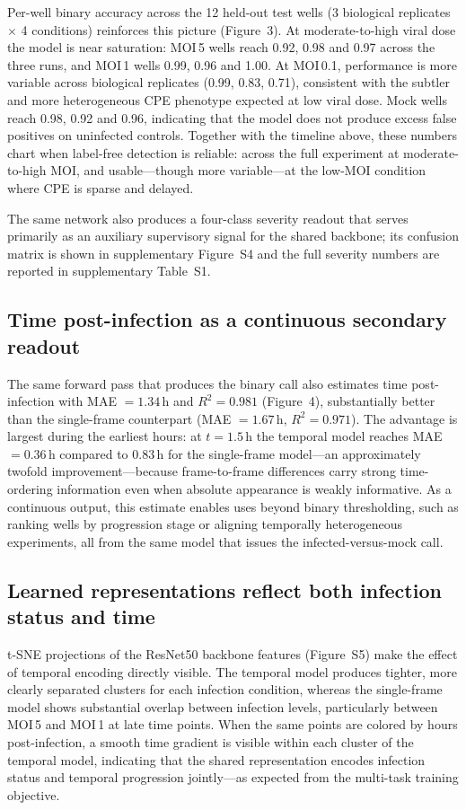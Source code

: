 \documentclass[12pt,letterpaper]{article}
\begin{document}
Per-well binary accuracy across the 12 held-out test wells (3 biological replicates $\times$ 4 conditions) reinforces this picture (Figure~3). At moderate-to-high viral dose the model is near saturation: MOI\,5 wells reach 0.92, 0.98 and 0.97 across the three runs, and MOI\,1 wells 0.99, 0.96 and 1.00. At MOI\,0.1, performance is more variable across biological replicates (0.99, 0.83, 0.71), consistent with the subtler and more heterogeneous CPE phenotype expected at low viral dose. Mock wells reach 0.98, 0.92 and 0.96, indicating that the model does not produce excess false positives on uninfected controls. Together with the timeline above, these numbers chart when label-free detection is reliable: across the full experiment at moderate-to-high MOI, and usable---though more variable---at the low-MOI condition where CPE is sparse and delayed.

The same network also produces a four-class severity readout that serves primarily as an auxiliary supervisory signal for the shared backbone; its confusion matrix is shown in supplementary Figure~S4 and the full severity numbers are reported in supplementary Table~S1.

\subsection*{Time post-infection as a continuous secondary readout}

The same forward pass that produces the binary call also estimates time post-infection with MAE $= 1.34$\,h and $R^2 = 0.981$ (Figure~4), substantially better than the single-frame counterpart (MAE $= 1.67$\,h, $R^2 = 0.971$). The advantage is largest during the earliest hours: at $t = 1.5$\,h the temporal model reaches MAE $= 0.36$\,h compared to 0.83\,h for the single-frame model---an approximately twofold improvement---because frame-to-frame differences carry strong time-ordering information even when absolute appearance is weakly informative. As a continuous output, this estimate enables uses beyond binary thresholding, such as ranking wells by progression stage or aligning temporally heterogeneous experiments, all from the same model that issues the infected-versus-mock call.

\subsection*{Learned representations reflect both infection status and time}

t-SNE projections of the ResNet50 backbone features (Figure~S5) make the effect of temporal encoding directly visible. The temporal model produces tighter, more clearly separated clusters for each infection condition, whereas the single-frame model shows substantial overlap between infection levels, particularly between MOI\,5 and MOI\,1 at late time points. When the same points are colored by hours post-infection, a smooth time gradient is visible within each cluster of the temporal model, indicating that the shared representation encodes infection status and temporal progression jointly---as expected from the multi-task training objective.
\end{document}
